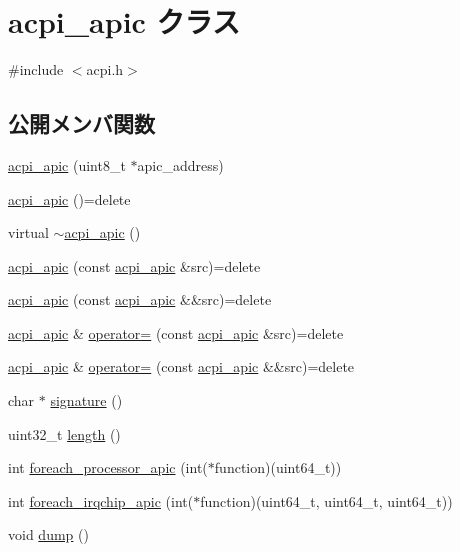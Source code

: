 \hypertarget{classacpi__apic}{}\section{acpi\+\_\+apic クラス}
\label{classacpi__apic}


{\ttfamily \#include $<$acpi.\+h$>$}

\subsection*{公開メンバ関数}
\begin{DoxyCompactItemize}
\item 
\hyperlink{classacpi__apic_aaa636a85e07fb4355d12635280edf517}{acpi\+\_\+apic} (uint8\+\_\+t $\ast$apic\+\_\+address)
\item 
\hyperlink{classacpi__apic_a3f8164e9adb40eb5c2c27f126a397715}{acpi\+\_\+apic} ()=delete
\item 
virtual \hyperlink{classacpi__apic_a81f721dc4a7e4e5d765e3a0c453a3e79}{$\sim$acpi\+\_\+apic} ()
\item 
\hyperlink{classacpi__apic_a8f68e76b4b3f8e39c475e26954a81a2e}{acpi\+\_\+apic} (const \hyperlink{classacpi__apic}{acpi\+\_\+apic} \&src)=delete
\item 
\hyperlink{classacpi__apic_a7c75e8b9a5b87493fbde26a86ffa5df0}{acpi\+\_\+apic} (const \hyperlink{classacpi__apic}{acpi\+\_\+apic} \&\&src)=delete
\item 
\hyperlink{classacpi__apic}{acpi\+\_\+apic} \& \hyperlink{classacpi__apic_a476b0daaeec3225c9a4f68114d276bd3}{operator=} (const \hyperlink{classacpi__apic}{acpi\+\_\+apic} \&src)=delete
\item 
\hyperlink{classacpi__apic}{acpi\+\_\+apic} \& \hyperlink{classacpi__apic_acd939e20b14be73b59876556548c3ff5}{operator=} (const \hyperlink{classacpi__apic}{acpi\+\_\+apic} \&\&src)=delete
\item 
char $\ast$ \hyperlink{classacpi__apic_a7b763605f2e261a30200bdabd26a022c}{signature} ()
\item 
uint32\+\_\+t \hyperlink{classacpi__apic_a2a84d72623015c66cc7aae8b154f6dd8}{length} ()
\item 
int \hyperlink{classacpi__apic_a54cec0a38788cb5df1544ad5ed412e8c}{foreach\+\_\+processor\+\_\+apic} (int($\ast$function)(uint64\+\_\+t))
\item 
int \hyperlink{classacpi__apic_a5790b7de6edd98af4e499e048dda62a4}{foreach\+\_\+irqchip\+\_\+apic} (int($\ast$function)(uint64\+\_\+t, uint64\+\_\+t, uint64\+\_\+t))
\item 
void \hyperlink{classacpi__apic_a91ad1b58ee35b7efaee43b00c1816877}{dump} ()
\end{DoxyCompactItemize}


